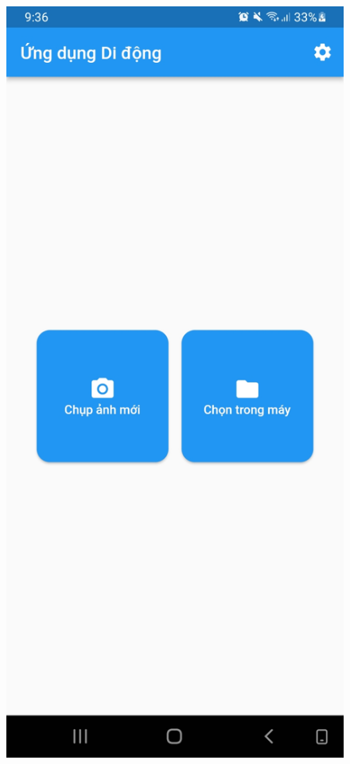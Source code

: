 \documentclass[a4paper,14pt]{extarticle}
\begin{document}
	\begin{figure}[H]
		\centering
		\includegraphics[scale=0.1]{images/screenshot1.jpg}

\end{figure}
\end{document}
